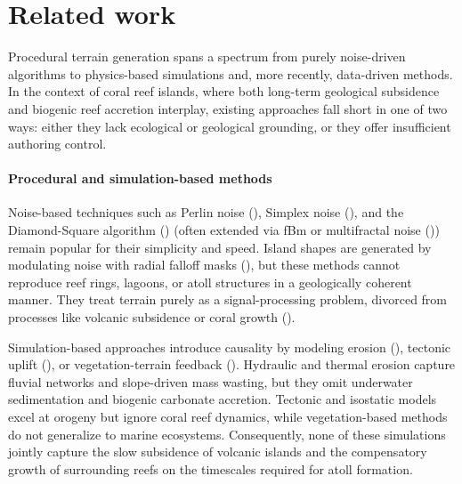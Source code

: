 \section{Related work}

Procedural terrain generation spans a spectrum from purely noise-driven algorithms to physics-based simulations and, more recently, data-driven methods. In the context of coral reef islands, where both long-term geological subsidence and biogenic reef accretion interplay, existing approaches fall short in one of two ways: either they lack ecological or geological grounding, or they offer insufficient authoring control.

\paragraph{Procedural and simulation-based methods}
Noise-based techniques such as Perlin noise (\cite{Perlin1985}), Simplex noise (\cite{Perlin2001}), and the Diamond-Square algorithm (\cite{Fournier1982}) (often extended via fBm or multifractal noise (\cite{Musgrave1989,Ebert2003})) remain popular for their simplicity and speed. Island shapes are generated by modulating noise with radial falloff masks (\cite{Olsen2004}), but these methods cannot reproduce reef rings, lagoons, or atoll structures in a geologically coherent manner. They treat terrain purely as a signal-processing problem, divorced from processes like volcanic subsidence or coral growth (\cite{Smelik2009,Galin2019}).

Simulation-based approaches introduce causality by modeling erosion (\cite{Benes2006,Neidhold2005,Mei2007}), tectonic uplift (\cite{Cordonnier2016,Cordonnier2017a,Schott2023}), or vegetation-terrain feedback (\cite{Ecormier-Nocca2021,Cordonnier2017b}). Hydraulic and thermal erosion capture fluvial networks and slope-driven mass wasting, but they omit underwater sedimentation and biogenic carbonate accretion. Tectonic and isostatic models excel at orogeny but ignore coral reef dynamics, while vegetation-based methods do not generalize to marine ecosystems. Consequently, none of these simulations jointly capture the slow subsidence of volcanic islands and the compensatory growth of surrounding reefs on the timescales required for atoll formation.

